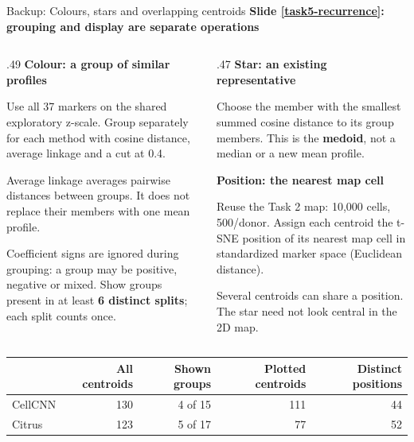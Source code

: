 \documentclass[aspectratio=169,10pt]{beamer}
\newcommand{\eyebrow}[1]{{\color{Teal}\bfseries #1}\par\smallskip}
\begin{document}
\begin{frame}{Backup: Colours, stars and overlapping centroids}
  \small
  \eyebrow{Slide \ref{task5-recurrence}: grouping and display are separate operations}
  \begin{columns}[T,onlytextwidth]
    \begin{column}{.49\textwidth}
      \textbf{Colour: a group of similar profiles}\par
      Use all 37 markers on the shared exploratory z-scale. Group separately for each method with cosine distance, average linkage and a cut at 0.4.\par\smallskip
      Average linkage averages pairwise distances between groups. It does not replace their members with one mean profile.\par\smallskip
      Coefficient signs are ignored during grouping: a group may be positive, negative or mixed. Show groups present in at least \textbf{6 distinct splits}; each split counts once.
    \end{column}
    \begin{column}{.47\textwidth}
      \textbf{Star: an existing representative}\par
      Choose the member with the smallest summed cosine distance to its group members. This is the \textbf{medoid}, not a median or a new mean profile.\par\medskip
      \textbf{Position: the nearest map cell}\par
      Reuse the Task 2 map: 10,000 cells, 500/donor. Assign each centroid the t-SNE position of its nearest map cell in standardized marker space (Euclidean distance).\par\smallskip
      Several centroids can share a position. The star need not look central in the 2D map.
    \end{column}
  \end{columns}\par\medskip
  {\scriptsize\renewcommand{\arraystretch}{1.15}
  \begin{tabular}{@{}lrrrr@{}}\toprule
    & All centroids & Shown groups & Plotted centroids & Distinct positions\\\midrule
    CellCNN & 130 & 4 of 15 & 111 & 44\\
    Citrus & 123 & 5 of 17 & 77 & 52\\\bottomrule
  \end{tabular}}
\end{frame}
\end{document}

